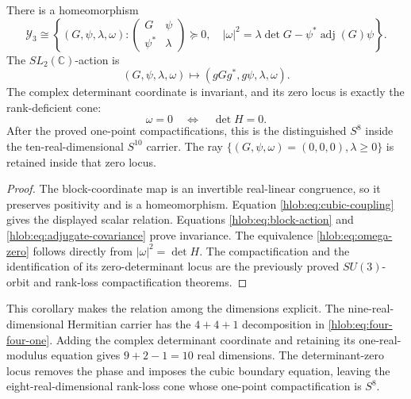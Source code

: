 \begin{corollary}
\label{hlob:cor:Y3-block-form}
There is a homeomorphism
\begin{equation}
 \mathcal Y_3\cong
 \left\{(G,\psi,\lambda,\omega):
 \begin{pmatrix}G&\psi\\\psi^*&\lambda\end{pmatrix}\succeq0,\quad
 |\omega|^2
 =\lambda\det G-\psi^*\operatorname{adj}(G)\psi
 \right\}.
 \label{hlob:eq:Y3-block-homeomorphism}
\end{equation}
The \(SL_2(\mathbb C)\)-action is
\begin{equation}
 (G,\psi,\lambda,\omega)\longmapsto
 (gGg^*,g\psi,\lambda,\omega).
 \label{hlob:eq:Y3-action}
\end{equation}
The complex determinant coordinate is invariant, and its zero locus is
exactly the rank-deficient cone:
\begin{equation}
 \omega=0\quad\Longleftrightarrow\quad\det H=0.
 \label{hlob:eq:omega-zero}
\end{equation}
After the proved one-point compactifications, this is the distinguished
\(S^8\) inside the ten-real-dimensional \(S^{10}\) carrier.  The ray
\(\{(G,\psi,\omega)=(0,0,0),\lambda\geq0\}\) is retained inside that
zero locus.
\end{corollary}

\begin{proof}
The block-coordinate map is an invertible real-linear congruence, so it
preserves positivity and is a homeomorphism.  Equation
\eqref{hlob:eq:cubic-coupling} gives the displayed scalar relation.
Equations \eqref{hlob:eq:block-action} and
\eqref{hlob:eq:adjugate-covariance} prove invariance.  The equivalence
\eqref{hlob:eq:omega-zero} follows directly from
\(|\omega|^2=\det H\).  The compactification and the identification of its
zero-determinant locus are the previously proved \(SU(3)\)-orbit and
rank-loss compactification theorems.
\end{proof}

This corollary makes the relation among the dimensions explicit.  The
nine-real-dimensional Hermitian carrier has the \(4+4+1\) decomposition in
\eqref{hlob:eq:four-four-one}.  Adding the complex determinant coordinate
and retaining its one-real-modulus equation gives \(9+2-1=10\) real
dimensions.  The determinant-zero locus removes the phase and imposes the
cubic boundary equation, leaving the eight-real-dimensional rank-loss cone
whose one-point compactification is \(S^8\).


